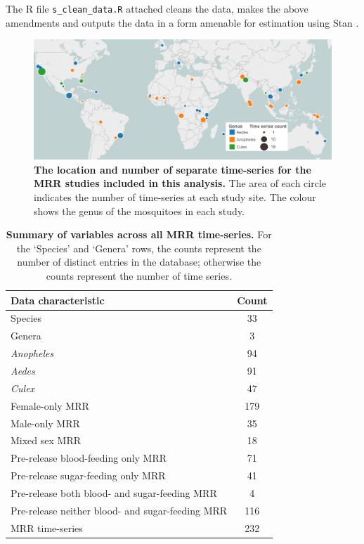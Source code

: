 \documentclass[12pt]{article}
\begin{document}
The R file \verb|s_clean_data.R| attached cleans the data, makes the above amendments and outputs the data in a form amenable for estimation using Stan \citep{carpenter2016stan}.

\begin{figure}[h]
	\centerline{\includegraphics[width=1.25\textwidth]{./Figure_files/mrr_mapGenusCropped.pdf}}
	\caption{\textbf{The location and number of separate time-series for the MRR studies included in this analysis.} The area of each circle indicates the number of time-series at each study site. The colour shows the genus of the mosquitoes in each study.}
	\label{fig:mrr_lifetimes_map}
\end{figure}


\begin{table}[htbp]
	\centering
	\begin{tabular}{lc}
		\toprule
		\textbf{Data characteristic} & \textbf{Count} \\
		\midrule
		Species & 33 \\
		Genera & 3 \\
		\textit{Anopheles} & 94 \\
		\textit{Aedes} & 91 \\
		\textit{Culex} & 47 \\
		Female-only MRR & 179 \\
		Male-only MRR & 35 \\
		Mixed sex MRR & 18 \\
		Pre-release blood-feeding only MRR & 71 \\
		Pre-release sugar-feeding only MRR & 41 \\
		Pre-release both blood- and sugar-feeding MRR & 4 \\
		Pre-release neither blood- and sugar-feeding MRR & 116 \\
		MRR time-series & 232 \\
		\bottomrule
	\end{tabular}%
	\caption{\textbf{Summary of variables across all MRR time-series.} For the `Species' and `Genera' rows, the counts represent the number of distinct entries in the database; otherwise the counts represent the number of time series.}
	\label{tab:mrr_aggregateData}%
\end{table}%
\end{document}
